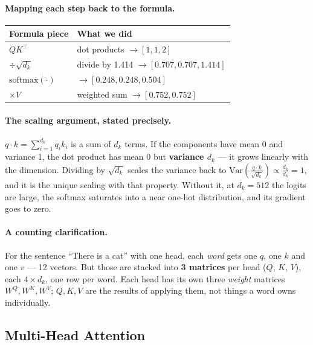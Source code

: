 \documentclass[11pt,a4paper]{article}
\begin{document}
\paragraph{Mapping each step back to the formula.}
\begin{center}
\begin{tabular}{ll}
\textbf{Formula piece} & \textbf{What we did} \\
\hline
$QK^\top$ & dot products $\rightarrow [1, 1, 2]$ \\
$\div \sqrt{d_k}$ & divide by 1.414 $\rightarrow [0.707, 0.707, 1.414]$ \\
$\mathrm{softmax}(\cdot)$ & $\rightarrow [0.248, 0.248, 0.504]$ \\
$\times V$ & weighted sum $\rightarrow [0.752, 0.752]$ \\
\end{tabular}
\end{center}

\paragraph{The scaling argument, stated precisely.} $q \cdot k = \sum_{i=1}^{d_k} q_i k_i$ is
a sum of $d_k$ terms. If the components have mean 0 and variance 1, the dot product has mean 0
but \textbf{variance $d_k$} --- it grows linearly with the dimension. Dividing by $\sqrt{d_k}$
scales the variance back to
$\mathrm{Var}\!\left(\frac{q \cdot k}{\sqrt{d_k}}\right) \propto \frac{d_k}{d_k} = 1$,
and it is the unique scaling with that property. Without it, at $d_k = 512$ the logits are
large, the softmax saturates into a near one-hot distribution, and its gradient goes to zero.

\paragraph{A counting clarification.} For the sentence ``There is a cat'' with one head, each
\emph{word} gets one $q$, one $k$ and one $v$ --- 12 vectors. But those are stacked into
\textbf{3 matrices} per head ($Q$, $K$, $V$), each $4 \times d_k$, one row per word. Each head
has its own three \emph{weight} matrices $W^Q, W^K, W^V$; $Q, K, V$ are the results of
applying them, not things a word owns individually.

\subsection{Multi-Head Attention}
\end{document}
